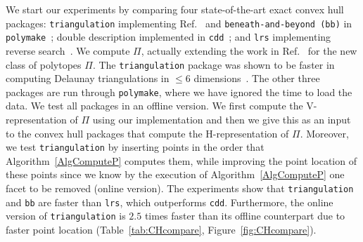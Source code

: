 \documentclass{article}
\newcommand\refcite[1]{\citealp{#1}} \newcommand\citess[1]{\textsuperscript{\textup{\citealp{#1}}}}
\begin{document}
We start our experiments by comparing four state-\-of-\-the-\-art exact
convex hull packages: {\tt triangulation} implementing Ref.~\refcite{CMS93}
and 
{\tt beneath-\-and-\-beyond (bb)} in {\tt polymake}~\citess{GaJo02};
double description implemented in {\tt cdd}~\citess{cddFuku};
and {\tt lrs} implementing reverse search~\citess{Avis98lrs}.
We compute $\varPi$, actually extending the work in Ref.~\refcite{AvBrSe97}
for the new class of polytopes $\varPi$.
The {\tt triangulation} package was shown to be faster in computing Delaunay
triangulations in
$\le 6$ dimensions~\citess{BoiDevHor09}.  
The other three packages are run through {\tt polymake}, where we have ignored
the time to load the data.
We test all packages in an {offline version}. We first compute the
V-representation of $\varPi$ using our implementation and then we give this as
an input to the convex hull packages that compute the H-representation of
$\varPi$. Moreover, we test {\tt triangulation}
by inserting points in the order that Algorithm~\ref{AlgComputeP} computes them,
while improving the point location of these points since we know by the
execution of Algorithm~\ref{AlgComputeP} one facet to be  removed (online version).
The experiments show that {\tt triangulation} and {\tt bb}
are faster than {\tt lrs}, which outperforms {\tt cdd}. 
Furthermore, the online version of {\tt triangulation} is $2.5$ times
faster than its offline counterpart due to faster point location
(Table~\ref{tab:CHcompare}, Figure~\ref{fig:CHcompare}).
\end{document}
